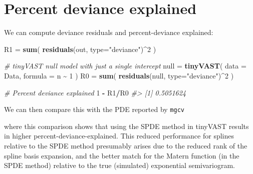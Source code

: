 \documentclass[
]{article}
\newenvironment{Shaded}{\begin{snugshade}}{\end{snugshade}}
\newcommand{\AttributeTok}[1]{\textcolor[rgb]{0.13,0.29,0.53}{#1}}
\newcommand{\CommentTok}[1]{\textcolor[rgb]{0.56,0.35,0.01}{\textit{#1}}}
\newcommand{\DecValTok}[1]{\textcolor[rgb]{0.00,0.00,0.81}{#1}}
\newcommand{\FunctionTok}[1]{\textcolor[rgb]{0.13,0.29,0.53}{\textbf{#1}}}
\newcommand{\NormalTok}[1]{#1}
\newcommand{\OtherTok}[1]{\textcolor[rgb]{0.56,0.35,0.01}{#1}}
\newcommand{\SpecialCharTok}[1]{\textcolor[rgb]{0.81,0.36,0.00}{\textbf{#1}}}
\newcommand{\StringTok}[1]{\textcolor[rgb]{0.31,0.60,0.02}{#1}}
\begin{document}
\section{Percent deviance explained}\label{percent-deviance-explained}

We can compute deviance residuals and percent-deviance explained:

\begin{Shaded}
\begin{Highlighting}[]
\NormalTok{R1 }\OtherTok{=} \FunctionTok{sum}\NormalTok{( }\FunctionTok{residuals}\NormalTok{(out, }\AttributeTok{type=}\StringTok{"deviance"}\NormalTok{)}\SpecialCharTok{\^{}}\DecValTok{2}\NormalTok{ )}

\CommentTok{\# tinyVAST null model with just a single intercept}
\NormalTok{null }\OtherTok{=} \FunctionTok{tinyVAST}\NormalTok{( }\AttributeTok{data =}\NormalTok{ Data,}
                 \AttributeTok{formula =}\NormalTok{ n }\SpecialCharTok{\textasciitilde{}} \DecValTok{1}\NormalTok{ )}
\NormalTok{R0 }\OtherTok{=} \FunctionTok{sum}\NormalTok{( }\FunctionTok{residuals}\NormalTok{(null, }\AttributeTok{type=}\StringTok{"deviance"}\NormalTok{)}\SpecialCharTok{\^{}}\DecValTok{2}\NormalTok{ )}

\CommentTok{\# Percent deviance explained}
\DecValTok{1} \SpecialCharTok{{-}}\NormalTok{ R1}\SpecialCharTok{/}\NormalTok{R0}
\CommentTok{\#\textgreater{} [1] 0.5051624}
\end{Highlighting}
\end{Shaded}

We can then compare this with the PDE reported by \texttt{mgcv}

\begin{Shaded}
\end{Shaded}

where this comparison shows that using the SPDE method in tinyVAST
results in higher percent-deviance-explained. This reduced performance
for splines relative to the SPDE method presumably arises due to the
reduced rank of the spline basis expansion, and the better match for the
Matern function (in the SPDE method) relative to the true (simulated)
exponential semivariogram.
\end{document}
